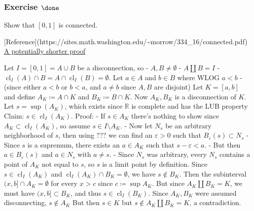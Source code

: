 \hypertarget{exercise-done-1}{%
\subsubsection{\texorpdfstring{Exercise
\(\done\)}{Exercise \textbackslash done}}\label{exercise-done-1}}

Show that \([0, 1]\) is connected.

\begin{solution}

\hfill

\begin{concept}

\hfill [Reference](https://sites.math.washington.edu/\textasciitilde morrow/334\_16/connected.pdf)
\href{https://math.stackexchange.com/questions/934421/proof-of-that-every-interval-is-connected}{A
potentially shorter proof}

\end{concept}

Let \(I = [0, 1] = A\cup B\) be a disconnection, so -
\(A, B \neq \emptyset\) - \(A {\coprod}B = I\) -
\(\operatorname{cl}_I(A) \cap B = A \cap\operatorname{cl}_I(B) = \emptyset\).
Let \(a\in A\) and \(b\in B\) where WLOG \(a<b\) - (since either \(a<b\)
or \(b<a\), and \(a\neq b\) since \(A, B\) are disjoint) Let
\(K = [a, b]\) and define \(A_K \coloneqq A\cap K\) and
\(B_K \coloneqq B\cap K\). Now \(A_K, B_K\) is a disconnection of \(K\).
Let \(s = \sup(A_K)\), which exists since \({\mathbb{R}}\) is complete
and has the LUB property Claim: \(s \in \operatorname{cl}_I(A_K)\).
Proof: - If \(s\in A_K\) there's nothing to show since
\(A_K \subset \operatorname{cl}_I(A_K)\), so assume
\(s\in I\setminus A_K\). - Now let \(N_s\) be an arbitrary neighborhood
of \(s\), then using ??? we can find an \(\varepsilon>0\) such that
\(B_\varepsilon(s) \subset N_s\) - Since \(s\) is a supremum, there
exists an \(a\in A_K\) such that \(s-\varepsilon< a\). - But then
\(a \in B_\varepsilon(s)\) and \(a\in N_s\) with \(a\neq s\). - Since
\(N_s\) was arbitrary, every \(N_s\) contains a point of \(A_K\) not
equal to \(s\), so \(s\) is a limit point by definition. Since
\(s\in \operatorname{cl}_I(A_K)\) and
\(\operatorname{cl}_I(A_K)\cap B_K = \emptyset\), we have
\(s\not \in B_K\). Then the subinterval \((x, b] \cap A_K = \emptyset\)
for every \(x>c\) since \(c \coloneqq\sup A_K\). But since
\(A_K {\coprod}B_K = K\), we must have \((x, b] \subset B_K\), and thus
\(s\in \operatorname{cl}_I(B_K)\). Since \(A_K, B_K\) were assumed
disconnecting, \(s\not \in A_K\) But then \(s\in K\) but
\(s\not\in A_K {\coprod}B_K = K\), a contradiction.

\end{solution}

